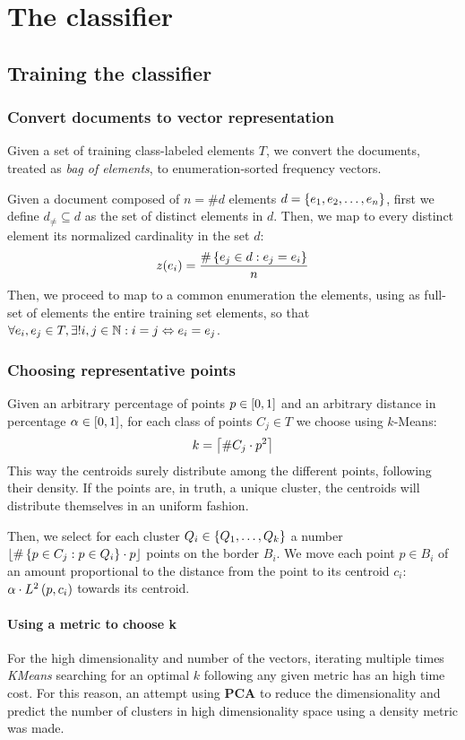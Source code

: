 \documentclass[\main/main.tex]{subfiles}
\begin{document}
\chapter{The classifier}

\section{Training the classifier}

\subsection{Convert documents to vector representation}
Given a set of training class-labeled elements \(T\), we convert the documents, treated as \textit{bag of elements}, to enumeration-sorted frequency vectors.

Given a document composed of \(n=\#d\) elements \(d = \left\{e_1, e_2, \ldots, e_n\right\}\), first we define \(d_\neq \subseteq d\) as the set of distinct elements in \(d\). Then, we map to every distinct element its normalized cardinality in the set \(d\):
\[
	z(e_i) = \frac{\#\left\{e_j \in d: e_j=e_i\right\}}{n}
\]
Then, we proceed to map to a common enumeration the elements, using as full-set of elements the entire training set elements, so that \(\forall e_i, e_j \in T, \exists! i, j \in \mathbb{N}: i=j \Leftrightarrow e_i=e_j \).

\subsection{Choosing representative points}
Given an arbitrary percentage of points \(p \in \left[0,1\right]\) and an arbitrary distance in percentage \(\alpha \in \left[0,1\right]\), for each class of points \(C_j \in T\) we choose using \(k\)-Means:
\[
	k=\left\lceil\#C_j\cdot p^2\right\rceil
\]
This way the centroids surely distribute among the different points, following their density. If the points are, in truth, a unique cluster, the centroids will distribute themselves in an uniform fashion.

Then, we select for each cluster \(Q_i \in \left\{Q_1, \ldots, Q_k\right\}\) a number \(\left\lfloor\#\left\{p \in C_j: p \in Q_i\right\}\cdot p\right\rfloor\) points on the border \(B_i\). We move each point \(p \in B_i\) of an amount proportional to the distance from the point to its centroid \(c_i\):\(\alpha \cdot L^2\left(p, c_i\right)\) towards its centroid.

\subsubsection{Using a metric to choose k}
For the high dimensionality and number of the vectors, iterating multiple times \textit{KMeans} searching for an optimal \(k\) following any given metric has an high time cost. For this reason, an attempt using \textbf{PCA} to reduce the dimensionality and predict the number of clusters in high dimensionality space using a density metric was made.
\end{document}
